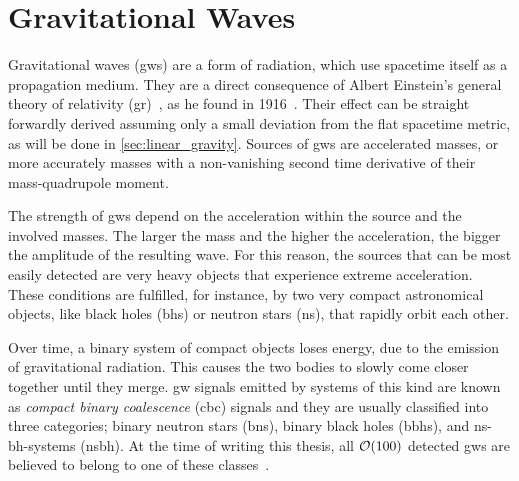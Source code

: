 \section{Gravitational Waves}\label{sec:gw_main}
Gravitational waves (\acrshort{gw}s) are a form of radiation, which use spacetime itself as a propagation medium. They are a direct consequence of Albert Einstein's general theory of relativity (\acrshort{gr})~\cite{Einstein:1916aab}, as he found in 1916~\cite{Einstein:1916aaa}. Their effect can be straight forwardly derived assuming only a small deviation from the flat spacetime metric, as will be done in \autoref{sec:linear_gravity}. Sources of \acrshort{gw}s are accelerated masses, or more accurately masses with a non-vanishing second time derivative of their mass-quadrupole moment.

The strength of \acrshort{gw}s depend on the acceleration within the source and the involved masses. The larger the mass and the higher the acceleration, the bigger the amplitude of the resulting wave. For this reason, the sources that can be most easily detected are very heavy objects that experience extreme acceleration. These conditions are fulfilled, for instance, by two very compact astronomical objects, like black holes (\acrshort{bh}s) or neutron stars (\acrshort{ns}), that rapidly orbit each other.

Over time, a binary system of compact objects loses energy, due to the emission of gravitational radiation. This causes the two bodies to slowly come closer together until they merge. \acrshort{gw} signals emitted by systems of this kind are known as \emph{compact binary coalescence} (\acrshort{cbc}) signals and they are usually classified into three categories; binary neutron stars (\acrshort{bns}), binary black holes (\acrshort{bbh}s), and \acrshort{ns}-\acrshort{bh}-systems (\acrshort{nsbh}). At the time of writing this thesis, all $\mathcal{O}{\left( 100 \right)}$ detected \acrshort{gw}s are believed to belong to one of these classes~\cite{LIGOScientific:2021djp, Nitz:2021zwj}. 

